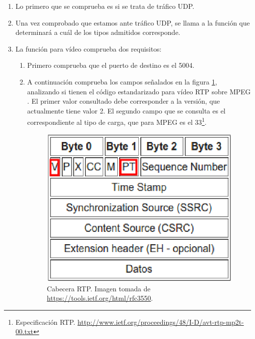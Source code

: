 \documentclass[a4paper,11pt]{book}
\begin{document}
\begin{enumerate}
\item Lo primero que se comprueba es si se trata de tráfico \ac{UDP}.
\item Una vez comprobado que estamos ante tráfico \ac{UDP}, se llama a la función que determinará a cuál de los tipos admitidos corresponde.
\item La función para vídeo comprueba dos requisitos:
\begin{enumerate}
\item Primero comprueba que el puerto de destino es el 5004.
\item A continuación comprueba los campos señalados en la figura \ref{RTPPayload}, analizando si tienen el código estandarizado para vídeo \ac{RTP} sobre \ac{MPEG} \cite{rtpMPEG}. El primer valor consultado debe corresponder a la versión, que actualmente tiene valor 2. El segundo campo que se consulta es el correspondiente al tipo de carga, que para MPEG es el 33\footnote{Especificación RTP. \url{http://www.ietf.org/proceedings/48/I-D/avt-rtp-mp2t-00.txt}}.

\begin{figure}[tb]
\centering
\includegraphics[scale=0.8]{./figuras/RTPPayload}
\caption[Cabecera RTP.]{Cabecera RTP. Imagen tomada de \url{https://tools.ietf.org/html/rfc3550}.}\label{RTPPayload}
\end{figure}

\end{enumerate}
\end{enumerate}
\end{document}
